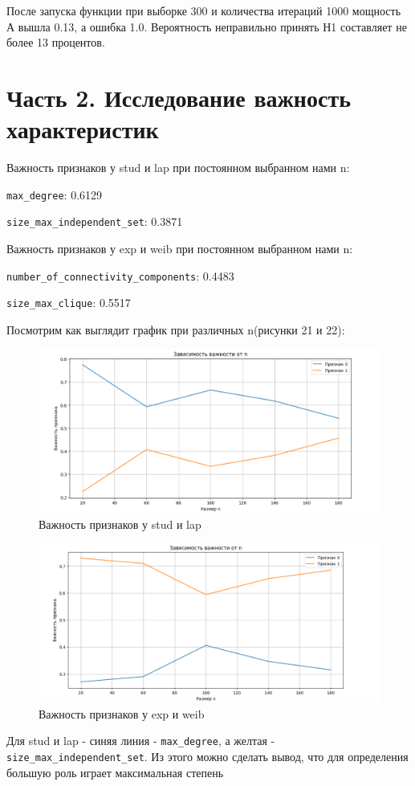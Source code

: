 \documentclass{HSEtitle}
\begin{document}
После запуска функции при выборке 300 и количества итераций 1000 мощность А  вышла 0.13, а ошибка 1.0.  Вероятность неправильно принять Н1 составляет не более 13 процентов.

\section{Часть 2. Исследование важность характеристик}

Важность признаков у stud и lap при постоянном выбранном нами n:

\texttt{max\_degree}: 0.6129

\texttt{size\_max\_independent\_set}: 0.3871

Важность признаков у exp и weib при постоянном выбранном нами n:

\texttt{number\_of\_connectivity\_components}: 0.4483

\texttt{size\_max\_clique}: 0.5517

Посмотрим как выглядит график при различных n(рисунки 21 и 22):

\begin{figure}
    \centering
    \includegraphics[width=0.5\linewidth]{importance1.png}
    \caption{Важность признаков у stud и lap}
    \label{fig:enter-label}
\end{figure}
\begin{figure}
    \centering
    \includegraphics[width=0.5\linewidth]{importance2.png}
    \caption{Важность признаков у exp и weib}
    \label{fig:enter-label}
\end{figure}

Для stud и lap - синяя линия - \texttt{max\_degree}, а желтая  - \texttt{size\_max\_independent\_set}. Из этого можно сделать вывод, что для определения большую роль играет максимальная степень
\end{document}
